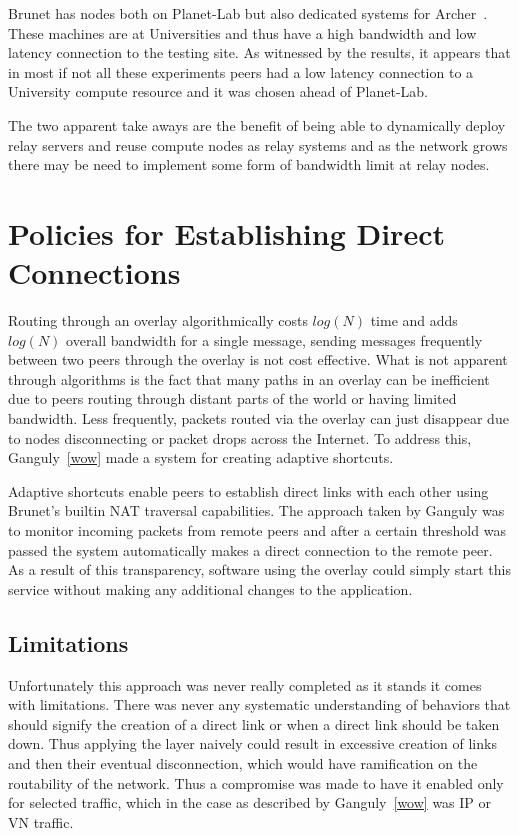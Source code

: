 Brunet has nodes both on Planet-Lab but also dedicated systems for
Archer~\cite{archer}.  These machines are at Universities and thus have a high
bandwidth and low latency connection to the testing site.  As witnessed by the
results, it appears that in most if not all these experiments peers had a low
latency connection to a University compute resource and it was chosen ahead of
Planet-Lab.

The two apparent take aways are the benefit of being able to dynamically deploy
relay servers and reuse compute nodes as relay systems and as the network grows
there may be need to implement some form of bandwidth limit at relay nodes.

\section{Policies for Establishing Direct Connections}

Routing through an overlay algorithmically costs $log(N)$ time and adds
$log(N)$ overall bandwidth for a single message, sending messages frequently
between two peers through the overlay is not cost effective.  What is not
apparent through algorithms is the fact that many paths in an overlay can be
inefficient due to peers routing through distant parts of the world or having
limited bandwidth.  Less frequently, packets routed via the overlay can just
disappear due to nodes disconnecting or packet drops across the Internet.  To
address this, Ganguly~\ref{wow} made a system for creating adaptive shortcuts.

Adaptive shortcuts enable peers to establish direct links with each other using
Brunet's builtin NAT traversal capabilities.  The approach taken by Ganguly was
to monitor incoming packets from remote peers and after a certain threshold was
passed the system automatically makes a direct connection to the remote peer.
As a result of this transparency, software using the overlay could simply start
this service without making any additional changes to the application.  

\subsection{Limitations}

Unfortunately this approach was never really completed as it stands it comes
with limitations.  There was never any systematic understanding of behaviors
that should signify the creation of a direct link or when a direct link should
be taken down.  Thus applying the layer naively could result in excessive
creation of links and then their eventual disconnection, which would have
ramification on the routability of the network.  Thus a compromise was made to
have it enabled only for selected traffic, which in the case as described by
Ganguly~\ref{wow} was IP or VN traffic.

